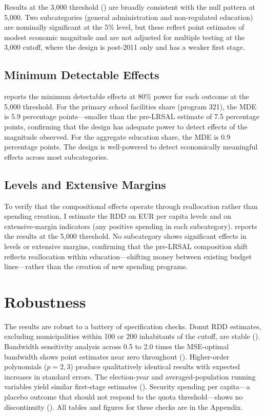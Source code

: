 \documentclass[12pt]{article}
\begin{document}
Results at the 3,000 threshold () are broadly consistent with the null pattern at 5,000. Two subcategories (general administration and non-regulated education) are nominally significant at the 5\% level, but these reflect point estimates of modest economic magnitude and are not adjusted for multiple testing at the 3,000 cutoff, where the design is post-2011 only and has a weaker first stage.



\subsection{Minimum Detectable Effects}

 reports the minimum detectable effects at 80\% power for each outcome at the 5,000 threshold. For the primary school facilities share (program 321), the MDE is 5.9 percentage points---smaller than the pre-LRSAL estimate of 7.5 percentage points, confirming that the design has adequate power to detect effects of the magnitude observed. For the aggregate education share, the MDE is 0.9 percentage points. The design is well-powered to detect economically meaningful effects across most subcategories.




\subsection{Levels and Extensive Margins}

To verify that the compositional effects operate through reallocation rather than spending creation, I estimate the RDD on EUR per capita levels and on extensive-margin indicators (any positive spending in each subcategory).  reports the results at the 5,000 threshold. No subcategory shows significant effects in levels or extensive margins, confirming that the pre-LRSAL composition shift reflects reallocation within education---shifting money between existing budget lines---rather than the creation of new spending programs.




\section{Robustness}

The results are robust to a battery of specification checks. Donut RDD estimates, excluding municipalities within 100 or 200 inhabitants of the cutoff, are stable (). Bandwidth sensitivity analysis across 0.5 to 2.0 times the MSE-optimal bandwidth shows point estimates near zero throughout (). Higher-order polynomials ($p = 2, 3$) produce qualitatively identical results with expected increases in standard errors. The election-year and averaged-population running variables yield similar first-stage estimates (). Security spending per capita---a placebo outcome that should not respond to the quota threshold---shows no discontinuity (). All tables and figures for these checks are in the Appendix.
\end{document}
